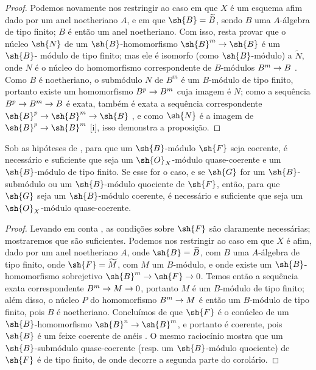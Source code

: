\documentclass[oneside]{amsart}
\makeatletter
\newcommand{\ega@arrow}[2]{\mathchoice{#1}{#2}{#2}{#2}}
\renewcommand{\to}{\ega@arrow{\longrightarrow}{\rightarrow}}
\newcommand{\oldpage}[2][]{{\marginnote{\normalfont\textbf{#1}~|~#2}}\ignorespaces}
\let\EGAOriginalLabel\label
\renewcommand{\label}[1]{\phantomsection\EGAOriginalLabel{#1}}
\makeatother
\begin{document}
\begin{proof}
Podemos novamente nos restringir ao caso em que $X$ é um esquema afim dado por um anel noetheriano $A$, e em que $\sh{B}=\widetilde{B}$, sendo $B$ uma $A$-álgebra de tipo finito; $B$ é então um anel noetheriano.
Com isso, resta provar que o núcleo $\sh{N}$ de um $\sh{B}$-homomorfismo $\sh{B}^m\to\sh{B}$ é um $\sh{B}$-
\oldpage[I]{180}
módulo de tipo finito; mas ele é isomorfo (como $\sh{B}$-módulo) a $\widetilde{N}$, onde $N$ é o núcleo do homomorfismo correspondente de $B$-módulos $B^m\to B$ .
Como $B$ é noetheriano, o submódulo $N$ de $B^m$ é um $B$-módulo de tipo finito, portanto existe um homomorfismo $B^p\to B^m$ cuja imagem é $N$; como a sequência $B^p\to B^m\to B$ é exata, também é exata a sequência correspondente $\sh{B}^p\to\sh{B}^m\to\sh{B}$ , e como $\sh{N}$ é a imagem de $\sh{B}^p\to\sh{B}^m$ [i], isso demonstra a proposição.
\end{proof}

\begin{corollary}[9.6.4]
\label{I.9.6.4}
Sob as hipóteses de , para que um $\sh{B}$-módulo $\sh{F}$ seja coerente, é necessário e suficiente que seja um $\sh{O}_X$-módulo quase-coerente e um $\sh{B}$-módulo de tipo finito.
Se esse for o caso, e se $\sh{G}$ for um $\sh{B}$-submódulo ou um $\sh{B}$-módulo quociente de $\sh{F}$, então, para que $\sh{G}$ seja um $\sh{B}$-módulo coerente, é necessário e suficiente que seja um $\sh{O}_X$-módulo quase-coerente.
\end{corollary}

\begin{proof}
Levando em conta , as condições sobre $\sh{F}$ são claramente necessárias; mostraremos que são suficientes.
Podemos nos restringir ao caso em que $X$ é afim, dado por um anel noetheriano $A$, onde $\sh{B}=\widetilde{B}$, com $B$ uma $A$-álgebra de tipo finito, onde $\sh{F}=\widetilde{M}$, com $M$ um $B$-módulo, e onde existe um $\sh{B}$-homomorfismo sobrejetivo $\sh{B}^m\to\sh{F}\to0$.
Temos então a sequência exata correspondente $B^m\to M\to0$, portanto $M$ é um $B$-módulo de tipo finito; além disso, o núcleo $P$ do homomorfismo $B^m\to M$ é então um $B$-módulo de tipo finito, pois $B$ é noetheriano.
Concluímos de  que $\sh{F}$ é o conúcleo de um $\sh{B}$-homomorfismo $\sh{B}^n\to\sh{B}^m$, e portanto é coerente, pois $\sh{B}$ é um feixe coerente de anéis .
O mesmo raciocínio mostra que um $\sh{B}$-submódulo quase-coerente (resp. um $\sh{B}$-módulo quociente) de $\sh{F}$ é de tipo finito, de onde decorre a segunda parte do corolário.
\end{proof}
\end{document}
